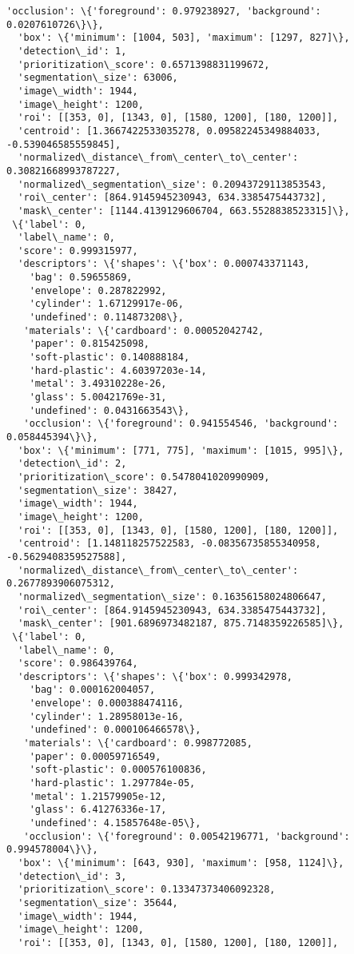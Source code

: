 \documentclass[11pt]{article}
\begin{document}
\begin{tcolorbox}[breakable, size=fbox, boxrule=.5pt, pad at break*=1mm, opacityfill=0]
\begin{Verbatim}[commandchars=\\\{\}]
   'occlusion': \{'foreground': 0.979238927, 'background': 0.0207610726\}\},
  'box': \{'minimum': [1004, 503], 'maximum': [1297, 827]\},
  'detection\_id': 1,
  'prioritization\_score': 0.6571398831199672,
  'segmentation\_size': 63006,
  'image\_width': 1944,
  'image\_height': 1200,
  'roi': [[353, 0], [1343, 0], [1580, 1200], [180, 1200]],
  'centroid': [1.3667422533035278, 0.09582245349884033, -0.539046585559845],
  'normalized\_distance\_from\_center\_to\_center': 0.30821668993787227,
  'normalized\_segmentation\_size': 0.20943729113853543,
  'roi\_center': [864.9145945230943, 634.3385475443732],
  'mask\_center': [1144.4139129606704, 663.5528838523315]\},
 \{'label': 0,
  'label\_name': 0,
  'score': 0.999315977,
  'descriptors': \{'shapes': \{'box': 0.000743371143,
    'bag': 0.59655869,
    'envelope': 0.287822992,
    'cylinder': 1.67129917e-06,
    'undefined': 0.114873208\},
   'materials': \{'cardboard': 0.00052042742,
    'paper': 0.815425098,
    'soft-plastic': 0.140888184,
    'hard-plastic': 4.60397203e-14,
    'metal': 3.49310228e-26,
    'glass': 5.00421769e-31,
    'undefined': 0.0431663543\},
   'occlusion': \{'foreground': 0.941554546, 'background': 0.058445394\}\},
  'box': \{'minimum': [771, 775], 'maximum': [1015, 995]\},
  'detection\_id': 2,
  'prioritization\_score': 0.5478041020990909,
  'segmentation\_size': 38427,
  'image\_width': 1944,
  'image\_height': 1200,
  'roi': [[353, 0], [1343, 0], [1580, 1200], [180, 1200]],
  'centroid': [1.148118257522583, -0.08356735855340958, -0.5629408359527588],
  'normalized\_distance\_from\_center\_to\_center': 0.2677893906075312,
  'normalized\_segmentation\_size': 0.16356158024806647,
  'roi\_center': [864.9145945230943, 634.3385475443732],
  'mask\_center': [901.6896973482187, 875.7148359226585]\},
 \{'label': 0,
  'label\_name': 0,
  'score': 0.986439764,
  'descriptors': \{'shapes': \{'box': 0.999342978,
    'bag': 0.000162004057,
    'envelope': 0.000388474116,
    'cylinder': 1.28958013e-16,
    'undefined': 0.000106466578\},
   'materials': \{'cardboard': 0.998772085,
    'paper': 0.00059716549,
    'soft-plastic': 0.000576100836,
    'hard-plastic': 1.297784e-05,
    'metal': 1.21579905e-12,
    'glass': 6.41276336e-17,
    'undefined': 4.15857648e-05\},
   'occlusion': \{'foreground': 0.00542196771, 'background': 0.994578004\}\},
  'box': \{'minimum': [643, 930], 'maximum': [958, 1124]\},
  'detection\_id': 3,
  'prioritization\_score': 0.13347373406092328,
  'segmentation\_size': 35644,
  'image\_width': 1944,
  'image\_height': 1200,
  'roi': [[353, 0], [1343, 0], [1580, 1200], [180, 1200]],

\end{Verbatim}
\end{tcolorbox}
\end{document}
